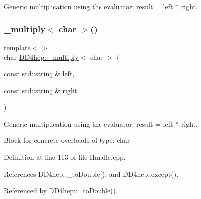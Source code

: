 Generic multiplication using the evaluator\+: result = left $\ast$ right. 

\hypertarget{group___d_d4_h_e_p___g_e_o_m_e_t_r_y_gae0b71c01cdf574471bd4de41a7dd522d}{}\label{group___d_d4_h_e_p___g_e_o_m_e_t_r_y_gae0b71c01cdf574471bd4de41a7dd522d} 
\subsubsection{\texorpdfstring{\+\_\+multiply$<$ char $>$()}{\_multiply< char >()}\hspace{0.1cm}{\footnotesize\ttfamily [1/3]}}
{\footnotesize\ttfamily template$<$$>$ \\
char \hyperlink{group___d_d4_h_e_p___g_e_o_m_e_t_r_y_gab860c2299e2eb50e537c5079fb0c9c51}{D\+D4hep\+::\+\_\+multiply}$<$ char $>$ (\begin{DoxyParamCaption}\item[{const std\+::string \&}]{left,  }\item[{const std\+::string \&}]{right }\end{DoxyParamCaption})}



Generic multiplication using the evaluator\+: result = left $\ast$ right. 

Block for concrete overloads of type\+: char 

Definition at line 113 of file Handle.\+cpp.



References D\+D4hep\+::\+\_\+to\+Double(), and D\+D4hep\+::except().



Referenced by D\+D4hep\+::\+\_\+to\+Double().

\hypertarget{group___d_d4_h_e_p___g_e_o_m_e_t_r_y_ga95129879194709ba020c55216963ca8c}{}\label{group___d_d4_h_e_p___g_e_o_m_e_t_r_y_ga95129879194709ba020c55216963ca8c} 
